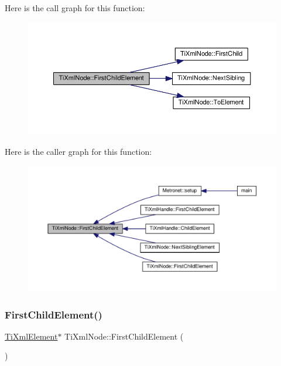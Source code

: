Here is the call graph for this function\+:\nopagebreak
\begin{figure}[H]
\begin{center}
\leavevmode
\includegraphics[width=350pt]{class_ti_xml_node_a12c973e1da9e90a178924b8ea5a5f4d1_cgraph}
\end{center}
\end{figure}
Here is the caller graph for this function\+:\nopagebreak
\begin{figure}[H]
\begin{center}
\leavevmode
\includegraphics[width=350pt]{class_ti_xml_node_a12c973e1da9e90a178924b8ea5a5f4d1_icgraph}
\end{center}
\end{figure}
\mbox{\label{class_ti_xml_node_aa0fecff1f3866ab33a8a25506e95db1d}} 
\subsubsection{\texorpdfstring{First\+Child\+Element()}{FirstChildElement()}\hspace{0.1cm}{\footnotesize\ttfamily [2/4]}}
{\footnotesize\ttfamily \hyperlink{class_ti_xml_element}{Ti\+Xml\+Element}$\ast$ Ti\+Xml\+Node\+::\+First\+Child\+Element (\begin{DoxyParamCaption}{ }\end{DoxyParamCaption})\hspace{0.3cm}{\ttfamily [inline]}}

